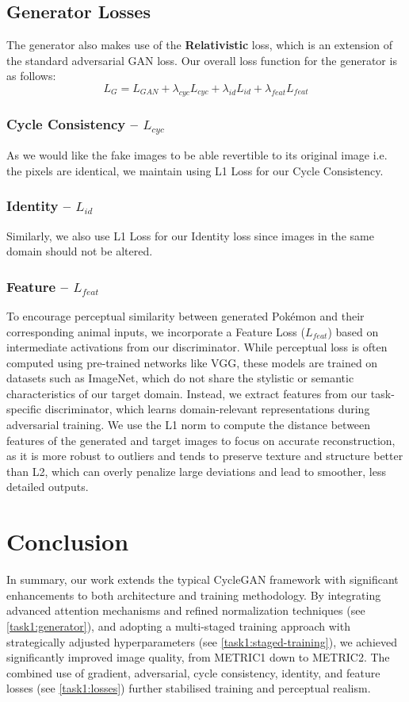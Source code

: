\documentclass[twoside,english,notitlepage]{report}
\begin{document}
\subsection{Generator Losses}
The generator also makes use of the \textbf{Relativistic} loss, which is an extension of the standard adversarial GAN loss. Our overall loss function for the generator is as follows:
\begin{equation}
    L_{G} = L_{GAN} + \lambda_{cyc} L_{cyc} + \lambda_{id} L_{id} + \lambda_{feat} L_{feat}
\end{equation}
\subsubsection{Cycle Consistency – $L_{cyc}$}
As we would like the fake images to be able revertible to its original image i.e. the pixels are identical, we maintain using L1 Loss for our Cycle Consistency.

\subsubsection{Identity – $L_{id}$}
Similarly, we also use L1 Loss for our Identity loss since images in the same domain should not be altered. 
\subsubsection{Feature – $L_{feat}$}
To encourage perceptual similarity between generated Pokémon and their corresponding animal inputs, we incorporate a Feature Loss ($L_{feat}$) based on intermediate activations from our discriminator. While perceptual loss is often computed using pre-trained networks like VGG, these models are trained on datasets such as ImageNet, which do not share the stylistic or semantic characteristics of our target domain. Instead, we extract features from our task-specific discriminator, which learns domain-relevant representations during adversarial training. We use the L1 norm to compute the distance between features of the generated and target images to focus on accurate reconstruction, as it is more robust to outliers and tends to preserve texture and structure better than L2, which can overly penalize large deviations and lead to smoother, less detailed outputs.

\section{Conclusion}
In summary, our work extends the typical CycleGAN framework with significant enhancements to both architecture and training methodology. By integrating advanced attention mechanisms and refined normalization techniques (see \ref{task1:generator}), and adopting a multi-staged training approach with strategically adjusted hyperparameters (see \ref{task1:staged-training}), we achieved significantly improved image quality, from METRIC1 down to METRIC2. The combined use of gradient, adversarial, cycle consistency, identity, and feature losses (see \ref{task1:losses}) further stabilised training and perceptual realism. 
\newpage
\end{document}
